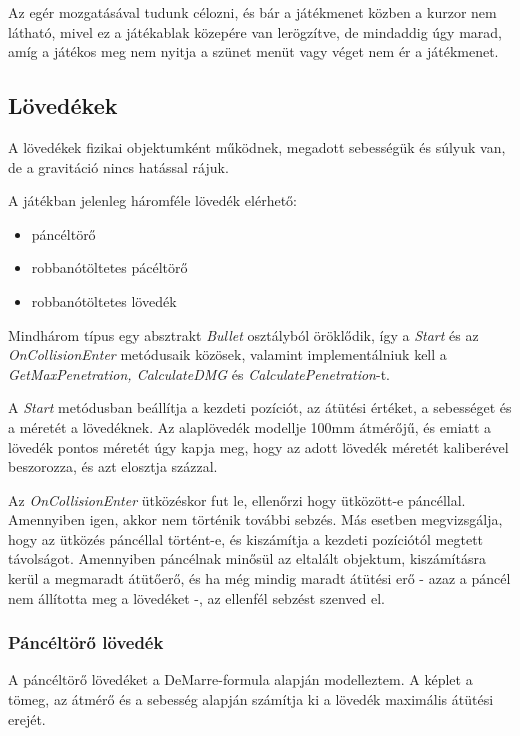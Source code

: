 \documentclass[
]{thesis-ekf}
\theoremstyle{definition}
\theoremstyle{remark}
\begin{document}
Az egér mozgatásával tudunk célozni, és bár a játékmenet közben a kurzor nem látható, mivel ez a játékablak közepére van lerögzítve, de mindaddig úgy marad, amíg a játékos meg nem nyitja a szünet menüt vagy véget nem ér a játékmenet.

\subsection{Lövedékek}

A lövedékek fizikai objektumként működnek, megadott sebességük és súlyuk van, de a gravitáció nincs hatással rájuk.

A játékban jelenleg háromféle lövedék elérhető:
\begin{itemize}
    \item páncéltörő
    \item robbanótöltetes pácéltörő
    \item robbanótöltetes lövedék
\end{itemize}

Mindhárom típus egy absztrakt \emph{Bullet} osztályból öröklődik, így a \emph{Start} és az \emph{OnCollisionEnter} metódusaik közösek, valamint implementálniuk kell a \emph{GetMaxPenetration, CalculateDMG} és \emph{CalculatePenetration}-t.



A \emph{Start} metódusban beállítja a kezdeti pozíciót, az átütési értéket, a sebességet és a méretét a lövedéknek. Az alaplövedék modellje 100mm átmérőjű, és emiatt a lövedék pontos méretét úgy kapja meg, hogy az adott lövedék méretét kaliberével beszorozza, és azt elosztja százzal.

Az \emph{OnCollisionEnter} ütközéskor fut le, ellenőrzi hogy ütközött-e páncéllal. \break
Amennyiben igen, akkor nem történik további sebzés. Más esetben megvizsgálja, hogy az ütközés páncéllal történt-e, és kiszámítja a kezdeti pozíciótól megtett távolságot. Amennyiben páncélnak minősül az eltalált objektum, kiszámításra kerül a megmaradt átütőerő, és ha még mindig maradt átütési erő - azaz a páncél nem állította meg a lövedéket -, az ellenfél sebzést szenved el.


\subsubsection{Páncéltörő lövedék}

A páncéltörő lövedéket a DeMarre-formula alapján modelleztem. A képlet a tömeg, az átmérő és a sebesség alapján számítja ki a lövedék maximális átütési erejét.
\end{document}
